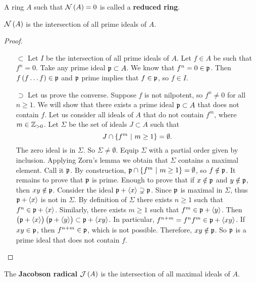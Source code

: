 A ring $ A $ such that $ \NNN\br{A} = 0 $ is called a \textbf{reduced ring}.

\begin{proposition}
\label{prop:5.3}
$ \NNN\br{A} $ is the intersection of all prime ideals of $ A $.
\end{proposition}

\begin{proof}
\hfill
\begin{itemize}
\item[$ \subset $] Let $ I $ be the intersection of all prime ideals of $ A $. Let $ f \in A $ be such that $ f^n = 0 $. Take any prime ideal $ \mathfrak{p} \subset A $. We know that $ f^n = 0 \in \mathfrak{p} $. Then $ f\br{f \dots f} \in \ppp $ and $ \mathfrak{p} $ prime implies that $ f \in \mathfrak{p} $, so $ f \in I $.
\item[$ \supset $] Let us prove the converse. Suppose $ f $ is not nilpotent, so $ f^n \ne 0 $ for all $ n \ge 1 $. We will show that there exists a prime ideal $ \mathfrak{p} \subset A $ that does not contain $ f $. Let us consider all ideals of $ A $ that do not contain $ f^m $, where $ m \in \mathbb{Z}_{> 0} $. Let $ \Sigma $ be the set of ideals $ J \subset A $ such that
$$ J \cap \cbr{f^m \st m \ge 1} = \emptyset. $$
The zero ideal is in $ \Sigma $. So $ \Sigma \ne \emptyset $. Equip $ \Sigma $ with a partial order given by inclusion. Applying Zorn's lemma we obtain that $ \Sigma $ contains a maximal element. Call it $ \mathfrak{p} $. By construction, $ \ppp \cap \cbr{f^m \st m \ge 1} = \emptyset $, so $ f \notin \mathfrak{p} $. It remains to prove that $ \mathfrak{p} $ is prime. Enough to prove that if $ x \notin \mathfrak{p} $ and $ y \notin \mathfrak{p} $, then $ xy \notin \mathfrak{p} $. Consider the ideal $ \mathfrak{p} + \left\langle x \right\rangle \supsetneq \mathfrak{p} $. Since $ \mathfrak{p} $ is maximal in $ \Sigma $, thus $ \mathfrak{p} + \left\langle x \right\rangle $ is not in $ \Sigma $. By definition of $ \Sigma $ there exists $ n \ge 1 $ such that $ f^n \in \mathfrak{p} + \left\langle x \right\rangle $. Similarly, there exists $ m \ge 1 $ such that $ f^m \in \mathfrak{p} + \left\langle y \right\rangle $. Then $ \br{\ppp + \abr{x}}\br{\ppp + \abr{y}} \subset \ppp + \abr{xy} $. In particular, $ f^{n + m} = f^nf^m \in \mathfrak{p} + \left\langle xy \right\rangle $. If $ xy \in \mathfrak{p} $, then $ f^{n + m} \in \mathfrak{p} $, which is not possible. Therefore, $ xy \notin \mathfrak{p} $. So $ \mathfrak{p} $ is a prime ideal that does not contain $ f $.
\end{itemize}
\end{proof}

\pagebreak

The \textbf{Jacobson radical} $ \JJJ\br{A} $ is the intersection of all maximal ideals of $ A $.


